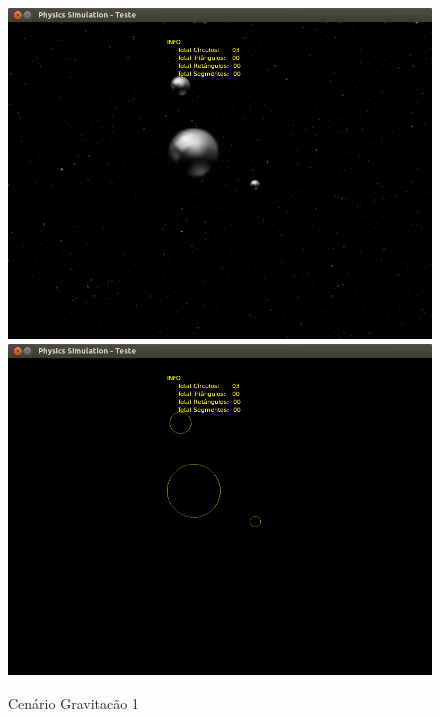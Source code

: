   \begin{figure}[H]
	\centering
	\caption{Cenário Gravitacão 1}
    \includegraphics[scale=0.4]{images/cenario-gravitacao-2.png}
    \includegraphics[scale=0.4]{images/cenario-gravitacao.png}
  \end{figure}

